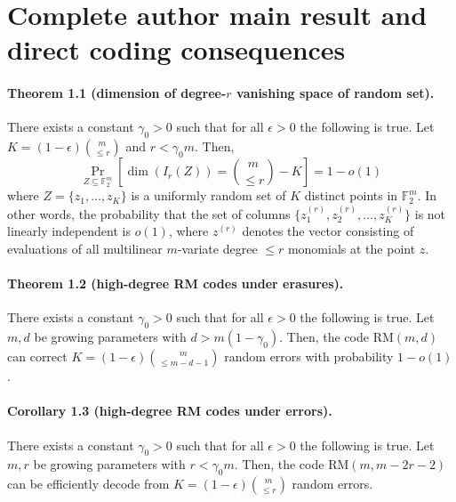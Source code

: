 \section*{Complete author main result and direct coding consequences}
\paragraph{Theorem 1.1 (dimension of degree-$r$ vanishing space of random set).} There exists a constant $\gamma_0>0$ such that for all $\epsilon>0$ the following is true. Let $K=(1-\epsilon)\binom m{\le r}$ and $r<\gamma_0m$. Then,
\[\Pr_{Z\subseteq\mathbb F_2^m}\left[\dim(I_r(Z))=\binom m{\le r}-K\right]=1-o(1)\]
where $Z=\{z_1,\ldots,z_K\}$ is a uniformly random set of $K$ distinct points in $\mathbb F_2^m$. In other words, the probability that the set of columns $\{z_1^{(r)},z_2^{(r)},\ldots,z_K^{(r)}\}$ is not linearly independent is $o(1)$, where $z^{(r)}$ denotes the vector consisting of evaluations of all multilinear $m$-variate degree $\le r$ monomials at the point $z$.
\paragraph{Theorem 1.2 (high-degree RM codes under erasures).} There exists a constant $\gamma_0>0$ such that for all $\epsilon>0$ the following is true. Let $m,d$ be growing parameters with $d>m(1-\gamma_0)$. Then, the code $\mathrm{RM}(m,d)$ can correct $K=(1-\epsilon)\binom m{\le m-d-1}$ random errors with probability $1-o(1)$.
\paragraph{Corollary 1.3 (high-degree RM codes under errors).} There exists a constant $\gamma_0>0$ such that for all $\epsilon>0$ the following is true. Let $m,r$ be growing parameters with $r<\gamma_0m$. Then, the code $\mathrm{RM}(m,m-2r-2)$ can be efficiently decode from $K=(1-\epsilon)\binom m{\le r}$ random errors.
